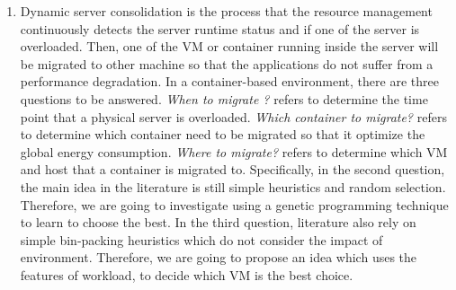 \begin{enumerate}
	\item Dynamic server consolidation is the process that the resource management continuously detects the server runtime status and if one of the server is overloaded. Then,
	one of the VM or container running inside the server will be migrated to other machine 
	so that the applications do not suffer from a performance degradation. In a container-based
	environment, there are three questions to be answered. \emph{When to migrate ?} refers to determine the time point that a physical server is overloaded. \emph{Which container to migrate?} refers to determine
	which container need to be migrated so that it optimize the global energy consumption.
	\emph{Where to migrate?} refers to determine which VM and host that a container is migrated to.  
	Specifically, in the second question, the main idea in the literature is still simple heuristics and random selection. Therefore, we are going to investigate using a genetic programming technique to learn to choose the best. In the 
	third question, literature also rely on simple bin-packing heuristics which do not consider the impact of environment. Therefore, we are going to propose an idea which uses the features of workload, to decide which VM
	is the best choice.


\end{enumerate}
